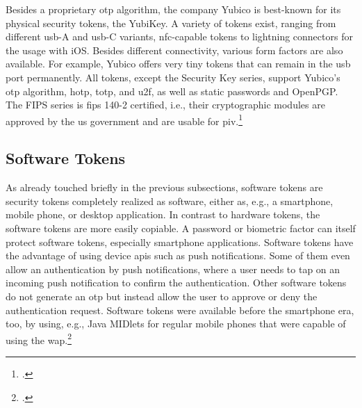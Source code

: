 Besides a proprietary \gls{otp} algorithm, the company Yubico is best-known for its physical security tokens, the YubiKey. A variety of tokens exist, ranging from different \gls{usb}-A and \gls{usb}-C variants, \gls{nfc}-capable tokens to lightning connectors for the usage with iOS. Besides different connectivity, various form factors are also available. For example, Yubico offers very tiny tokens that can remain in the \gls{usb} port permanently. All tokens, except the \frqq Security Key\flqq{} series, support Yubico's \gls{otp} algorithm, \gls{hotp}, \gls{totp}, and \gls{u2f}, as well as static passwords and OpenPGP. The \frqq FIPS series\flqq{} is \gls{fips} 140-2 certified, i.e., their cryptographic modules are approved by the \gls{us} government and are usable for \gls{piv}.\footcites[See][716]{HUSEYNOV2017715}[See][83]{Jacobs:2016:STA:2953926.2953927}[See][109]{Jacobs:2019}

\subsection{Software Tokens}

As already touched briefly in the previous subsections, software tokens are security tokens completely realized as software, either as, e.g., a smartphone, mobile phone, or desktop application. In contrast to hardware tokens, the software tokens are more easily copiable. A password or biometric factor can itself protect software tokens, especially smartphone applications. Software tokens have the advantage of using device \glspl{api} such as push notifications. Some of them even allow an \frqq authentication by push notifications\flqq, where a user needs to tap on an incoming push notification to confirm the authentication. Other software tokens do not generate an \gls{otp} but instead allow the user to approve or deny the authentication request. Software tokens were available before the smartphone era, too, by using, e.g., Java MIDlets for regular mobile phones that were capable of using the \gls{wap}.\footcites[See][717]{HUSEYNOV2017715}[See][111]{ELMALIKI201475}[See][60]{Ulqinaku:2019:FPP:3317549.3323404}[See][222--223]{dasgupta2017multi}[See][3]{4300040}
